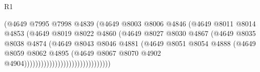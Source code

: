 \begin{lexlean}{R1}
\begin{coremodule}
                                              (@4649
                                                @7995
                                                @7998
                                                @4839
                                                (@4649
                                                  @8003
                                                  @8006
                                                  @4846
                                                  (@4649
                                                    @8011
                                                    @8014
                                                    @4853
                                                    (@4649
                                                      @8019
                                                      @8022
                                                      @4860
                                                      (@4649
                                                        @8027
                                                        @8030
                                                        @4867
                                                        (@4649
                                                          @8035
                                                          @8038
                                                          @4874
                                                          (@4649
                                                            @8043
                                                            @8046
                                                            @4881
                                                            (@4649
                                                              @8051
                                                              @8054
                                                              @4888
                                                              (@4649
                                                                @8059
                                                                @8062
                                                                @4895
                                                                (@4649
                                                                  @8067
                                                                  @8070
                                                                  @4902
                                                                  @4904)))))))))))))))))))))))))))))))

\end{coremodule}
\end{lexlean}
